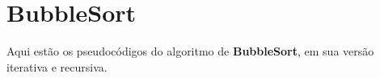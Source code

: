 \section{BubbleSort}
Aqui estão os pseudocódigos do algoritmo de \textbf{BubbleSort}, em sua versão iterativa e recursiva.
 
